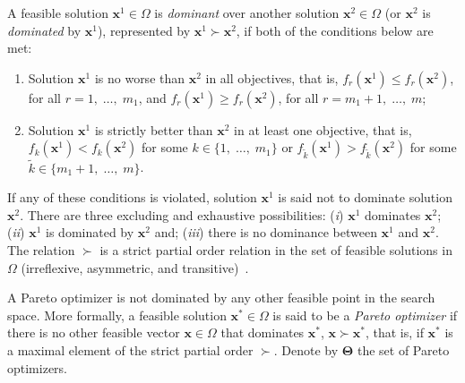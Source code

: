 \documentclass[final,5p,times,twocolumn,numbers]{elsarticle}
\begin{document}
A feasible solution $ \mathbf{x}^{1} \in \Omega $ is \textit{dominant} over another solution $ \mathbf{x}^{2} \in \Omega $ (or $ \mathbf{x}^{2} $ is \textit{dominated} by $ \mathbf{x}^{1} $), represented by $ \mathbf{x}^{1} \succ \mathbf{x}^{2} $, if both of the conditions below are met:
%
\begin{enumerate}
\item Solution $ \mathbf{x}^{1} $ is no worse than $ \mathbf{x}^{2} $ in all objectives, that is, $ f_{r} \left( \mathbf{x}^{1} \right) \leq f_{r} \left( \mathbf{x}^{2} \right) $, for all $ r = 1, \; \dots, \; m_{1} $, and $ f_{r} \left( \mathbf{x}^{1} \right) \geq f_{r} \left( \mathbf{x}^{2} \right) $, for all $ r = m_{1} + 1, \; \dots, \; m $;
\item Solution $ \mathbf{x}^{1} $ is strictly better than $ \mathbf{x}^{2} $ in at least one objective, that is, $ f_{k} \left( \mathbf{x}^{1} \right) < f_{k} \left( \mathbf{x}^{2} \right) $ for some $ k \in \lbrace 1, \; \dots, \; m_{1} \rbrace $ or $ f_{\tilde{k}} \left( \mathbf{x}^{1} \right) > f_{\tilde{k}} \left( \mathbf{x}^{2} \right) $ for some $ \tilde{k} \in \lbrace m_{1} + 1, \; \dots, \; m \rbrace $.
\end{enumerate}

\noindent If any of these conditions is violated, solution $ \mathbf{x}^{1} $ is said not to dominate solution $ \mathbf{x}^{2} $. There are three excluding and exhaustive possibilities: (\textit{i}) $ \mathbf{x}^{1} $ dominates $ \mathbf{x}^{2} $; (\textit{ii}) $ \mathbf{x}^{1} $ is dominated by $ \mathbf{x}^{2} $ and; (\textit{iii}) there is no dominance between $ \mathbf{x}^{1} $ and $ \mathbf{x}^{2} $. The relation $ \succ $ is a strict partial order relation in the set of feasible solutions in $ \Omega $ (irreflexive, asymmetric, and transitive)~\cite{bib:gersting2006}.

A Pareto optimizer is not dominated by any other feasible point in the search space. More formally, a feasible solution $ \mathbf{x}^{*} \in \Omega $ is said to be a \textit{Pareto optimizer} if there is no other feasible vector $ \mathbf{x} \in \Omega $ that dominates $ \mathbf{x}^{*} $, $ \mathbf{x} \succ \mathbf{x}^{*} $, that is, if $ \mathbf{x}^{*} $ is a maximal element of the strict partial order $ \succ $. Denote by $ \mathbf{\Theta} $ the set of Pareto optimizers.
\end{document}
